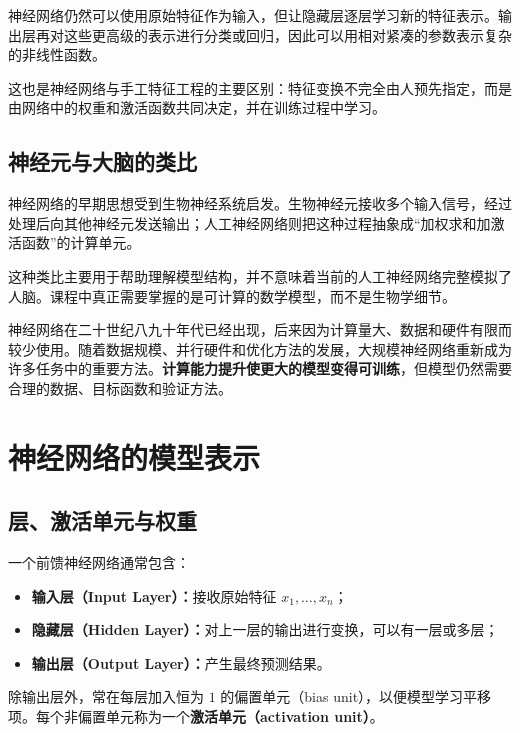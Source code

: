 \documentclass[12pt,a4paper]{ctexart}
\newcommand{\important}[1]{\textbf{\textcolor{MainColor}{#1}}}
\newcommand{\concept}[1]{\textbf{\textcolor{DefineColor}{#1}}}
\begin{document}
\begin{keybox}[神经网络解决什么问题]
神经网络仍然可以使用原始特征作为输入，但让隐藏层逐层学习新的特征表示。输出层再对这些更高级的表示进行分类或回归，因此可以用相对紧凑的参数表示复杂的非线性函数。

这也是神经网络与手工特征工程的主要区别：特征变换不完全由人预先指定，而是由网络中的权重和激活函数共同决定，并在训练过程中学习。
\end{keybox}

\subsection{神经元与大脑的类比}

\begin{definitionbox}[生物学启发]
神经网络的早期思想受到生物神经系统启发。生物神经元接收多个输入信号，经过处理后向其他神经元发送输出；人工神经网络则把这种过程抽象成“加权求和加激活函数”的计算单元。

这种类比主要用于帮助理解模型结构，并不意味着当前的人工神经网络完整模拟了人脑。课程中真正需要掌握的是可计算的数学模型，而不是生物学细节。
\end{definitionbox}

\begin{tipbox}[为什么近年应用重新兴起]
神经网络在二十世纪八九十年代已经出现，后来因为计算量大、数据和硬件有限而较少使用。随着数据规模、并行硬件和优化方法的发展，大规模神经网络重新成为许多任务中的重要方法。\important{计算能力提升使更大的模型变得可训练}，但模型仍然需要合理的数据、目标函数和验证方法。
\end{tipbox}

\section{神经网络的模型表示}

\subsection{层、激活单元与权重}

\begin{definitionbox}[神经网络的层]
一个前馈神经网络通常包含：
\begin{itemize}
  \item \textbf{输入层（Input Layer）：}接收原始特征 $x_1,\ldots,x_n$；
  \item \textbf{隐藏层（Hidden Layer）：}对上一层的输出进行变换，可以有一层或多层；
  \item \textbf{输出层（Output Layer）：}产生最终预测结果。
\end{itemize}
除输出层外，常在每层加入恒为 $1$ 的偏置单元（bias unit），以便模型学习平移项。每个非偏置单元称为一个\concept{激活单元（activation unit）}。
\end{definitionbox}
\end{document}
